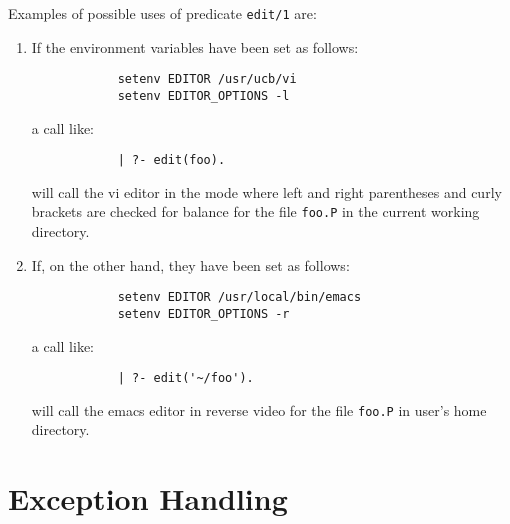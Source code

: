 \begin{description}
    Examples of possible uses of predicate {\tt edit/1} are:
    \begin{enumerate}
    \item If the environment variables have been set as follows:
          \begin{verbatim}
	        setenv EDITOR /usr/ucb/vi
	        setenv EDITOR_OPTIONS -l
          \end{verbatim}
          a call like:
          \begin{verbatim}
	        | ?- edit(foo).
          \end{verbatim}
          will call the vi editor in the mode where left and right parentheses
	  and curly brackets are checked for balance for the file {\tt foo.P}
	  in the current working directory.
    \item If, on the other hand, they have been set as follows:
          \begin{verbatim}
	        setenv EDITOR /usr/local/bin/emacs
	        setenv EDITOR_OPTIONS -r
          \end{verbatim}
          a call like:
          \begin{verbatim}
	        | ?- edit('~/foo').
          \end{verbatim}
          will call the emacs editor in reverse video for the file {\tt foo.P}
	  in user's home directory.
    \end{enumerate}

\end{description}




\section{Exception Handling}\label{exception}


